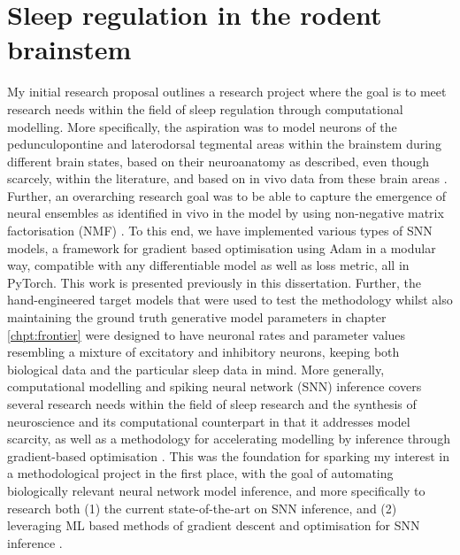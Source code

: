 \documentclass[mphil,deptreport,ianc]{infthesis} %
\begin{document}
\chapter{Sleep regulation in the rodent brainstem}\label{chpt:sleep}

My initial research proposal outlines a research project where the goal is to meet research needs within the field of sleep regulation through computational modelling.
More specifically, the aspiration was to model neurons of the pedunculopontine and laterodorsal tegmental areas within the brainstem during different brain states, based on their neuroanatomy as described, even though scarcely, within the literature, and based on in vivo data from these brain areas \cite{Herice2019c, Tsunematsu2019, Pal2007, Martinez-Gonzalez2011, Fraigne2015}.
Further, an overarching research goal was to be able to capture the emergence of neural ensembles as identified in vivo in the model by using non-negative matrix factorisation (NMF) \cite{Seung1999, Seung2001, Onken2016a}.
To this end, we have implemented various types of SNN models, a framework for gradient based optimisation using Adam in a modular way, compatible with any differentiable model as well as loss metric, all in PyTorch. This work is presented previously in this dissertation.
Further, the hand-engineered target models that were used to test the methodology whilst also maintaining the ground truth generative model parameters in chapter \ref{chpt:frontier} were designed to have neuronal rates and parameter values resembling a mixture of excitatory and inhibitory neurons, keeping both biological data and the particular sleep data in mind.
More generally, computational modelling and spiking neural network (SNN) inference covers several research needs within the field of sleep research and the synthesis of neuroscience and its computational counterpart in that it addresses model scarcity, as well as a methodology for accelerating modelling by inference through gradient-based optimisation \cite{Herice2019c, Huh2017, Taherkhani2020}.
This was the foundation for sparking my interest in a methodological project in the first place, with the goal of automating biologically relevant neural network model inference, and more specifically to research both (1) the current state-of-the-art on SNN inference, and (2) leveraging ML based methods of gradient descent and optimisation for SNN inference \cite{Huh2017, Mostafa2020, Tavanaei2019b, Lee2016}.
\end{document}
